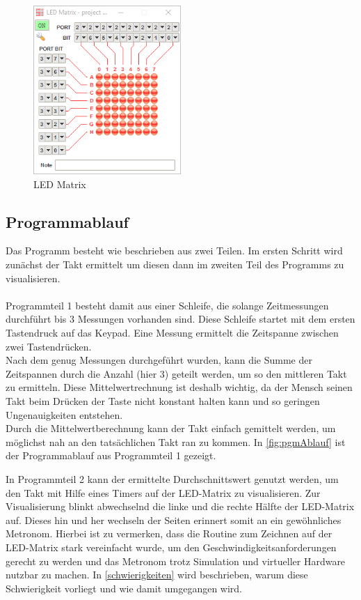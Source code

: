 \documentclass[a4paper, 12pt]{scrartcl}
\begin{document}
\begin{onehalfspace}
\begin{figure}[h]
\includegraphics[width=0.5\textwidth]{led.png}
\caption{LED Matrix}
\label{fig:led}
\end{figure}
\subsection{Programmablauf}
Das Programm besteht wie beschrieben aus zwei Teilen. Im ersten Schritt wird zunächst der Takt ermittelt um diesen dann im zweiten Teil des Programms zu visualisieren.
\\
\\
Programmteil 1 besteht damit aus einer Schleife, die solange Zeitmessungen durchführt bis 3 Messungen vorhanden sind. Diese Schleife startet mit dem ersten Tastendruck auf das Keypad. Eine Messung ermittelt die Zeitspanne zwischen zwei Tastendrücken. 
\\
Nach dem genug Messungen durchgeführt wurden, kann die Summe der Zeitspannen durch die Anzahl (hier 3) geteilt werden, um so den mittleren Takt zu ermitteln. Diese Mittelwertrechnung ist deshalb wichtig, da der Mensch seinen Takt beim Drücken der Taste nicht konstant halten kann und so geringen Ungenauigkeiten entstehen.
\\
Durch die Mittelwertberechnung kann der Takt einfach gemittelt werden, um möglichst nah an den tatsächlichen Takt ran zu kommen. In \autoref{fig:pgmAblauf} ist der Programmablauf aus Programmteil 1 gezeigt.

In Programmteil 2 kann der ermittelte Durchschnittswert genutzt werden, um den Takt mit Hilfe eines Timers auf der LED-Matrix zu visualisieren. Zur Visualisierung blinkt abwechselnd die linke und die rechte Hälfte der LED-Matrix auf. Dieses hin und her wechseln der Seiten erinnert somit an ein gewöhnliches Metronom. Hierbei ist zu vermerken, dass die Routine zum Zeichnen auf der LED-Matrix stark vereinfacht wurde, um den Geschwindigkeitsanforderungen gerecht zu werden und das Metronom trotz Simulation und virtueller Hardware nutzbar zu machen. In \autoref{schwierigkeiten} wird beschrieben, warum diese Schwierigkeit vorliegt und wie damit umgegangen wird.

\end{onehalfspace}
\end{document}
